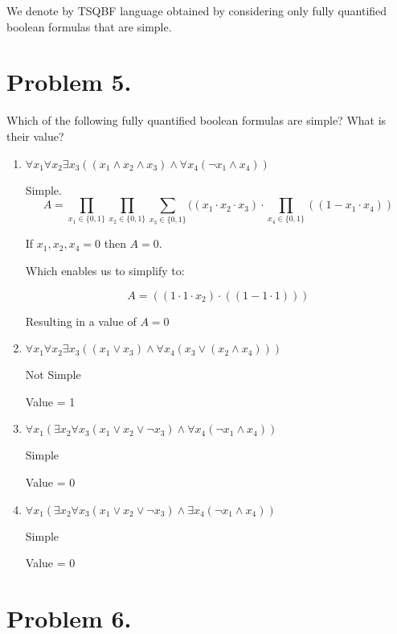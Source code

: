 \documentclass{article}
\begin{document}
We denote by TSQBF language obtained by considering only fully quantified boolean formulas that are simple.
\section*{Problem 5.}

Which of the following fully quantified boolean formulas are simple? What is their value?

\begin{enumerate}
    \item $\forall x_1 \forall x_2 \exists x_3 ((x_1 \wedge x_2 \wedge x_3) \wedge \forall x_4 (\neg x_1 \wedge x_4))$

        Simple.
        $$
        A = \prod_{x_{1} \in \{0,1\}} \prod_{x_{2} \in \{0,1\}} \sum_{x_{3} \in \{0,1\}}((x_{1} \cdot x_{2} \cdot x_{3}) \cdot \prod_{x_{4} \in \{0,1\}}((1-x_{1} \cdot x_{4}))
        $$

        If $x_{1}, x_{2}, x_{4} = 0$ then $A=0$.

        Which enables us to simplify to:

        $$
        A = ((1 \cdot 1 \cdot x_{2}) \cdot ((1 - 1 \cdot 1)))
        $$

        Resulting in a value of $A=0$

    \item $\forall x_1 \forall x_2 \exists x_3 ((x_1 \vee x_3) \wedge \forall x_4 (x_3 \vee (x_2 \wedge x_4)))$

        Not Simple

        Value = 1

    \item $\forall x_1 (\exists x_2 \forall x_3 (x_1 \vee x_2 \vee \neg x_3) \wedge \forall x_4 (\neg x_1 \wedge x_4))$

        Simple

        Value = 0

    \item $\forall x_1 (\exists x_2 \forall x_3 (x_1 \vee x_2 \vee \neg x_3) \wedge \exists x_4 (\neg x_1 \wedge x_4))$

        Simple

        Value = 0


\end{enumerate}

\section*{Problem 6.}
\end{document}
